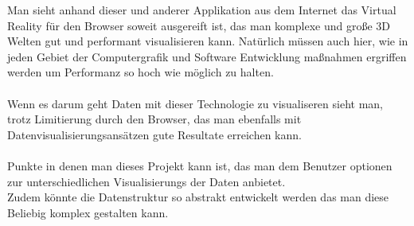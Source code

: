 
Man sieht anhand dieser und anderer Applikation aus dem Internet das Virtual Reality für den Browser soweit ausgereift ist, das man
komplexe und große 3D Welten gut und performant visualisieren kann. Natürlich müssen auch hier, wie in jeden Gebiet der Computergrafik und
Software Entwicklung maßnahmen ergriffen werden um Performanz so hoch wie möglich zu halten.\\ \\
Wenn es darum geht Daten mit dieser Technologie zu visualiseren sieht man, trotz Limitierung durch den Browser, das man ebenfalls mit
Datenvisualisierungsansätzen gute Resultate erreichen kann. \\ \\
Punkte in denen man dieses Projekt kann ist, das man dem Benutzer optionen zur unterschiedlichen Visualisierungs der Daten anbietet. \\
Zudem könnte die Datenstruktur so abstrakt entwickelt werden das man diese Beliebig komplex gestalten kann.

